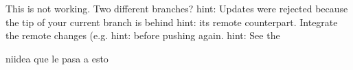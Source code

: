 This is not working. Two different branches?
hint: Updates were rejected because the tip of your current branch is behind
hint: its remote counterpart. Integrate the remote changes (e.g.
hint:  before pushing again.
hint: See the 

niidea que le pasa a esto

